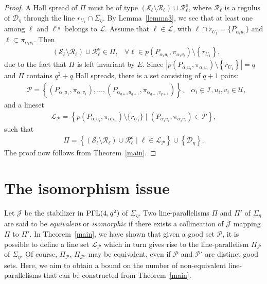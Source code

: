 \documentclass[11pt]{article}
\theoremstyle{definition}
\numberwithin{equation}{section}
\def\cI{\mathcal I}
\def\cJ{\mathcal J}
\def\cL{\mathcal L}
\def\cP{\mathcal P}
\def\cD{\mathcal D}
\def\cU{\mathcal U}
\def\cR{\mathcal R}
\def\cS{\mathcal S}
\def\PGaL{{\rm P\Gamma L}}
\begin{document}
\begin{proof}
A Hall spread of $\Pi$ must be of type $\left(\cS_{\ell} \setminus \cR_{\ell}\right) \cup \cR_{\ell}^o$, where $\cR_{\ell}$ is a regulus of $\cD_{\eta}$ through the line $r_{U_1} \cap \Sigma_{\eta}$. By Lemma~\ref{lemma3}, 
we see that at least one among $\ell$ and $\ell^{\tau_\eta}$ belongs to $\cL$. Assume that $\ell \in \cL$, with $\ell \cap r_{U_1} = \{P_{\alpha_i u_i}\}$ and $\ell \subset \pi_{\alpha_i v_i}$. Then
\begin{align*}
    & \left(\cS_{\ell} \setminus \cR_{\ell}\right) \cup \cR_{\ell}^o \in \Pi, & \forall \ell \in p\left( P_{\alpha_i u_i}, \pi_{\alpha_i v_i} \right) \setminus \left\{r_{U_1}\right\},
\end{align*}
due to the fact that $\Pi$ is left invariant by $E$. Since $\left|p\left( P_{\alpha_i u_i}, \pi_{\alpha_i v_i} \right) \setminus \left\{r_{U_1}\right\}\right| = q$ and $\Pi$ contains $q^2+q$ Hall spreads, there is a set consisting of $q+1$ pairs:
\begin{align*}
& \cP = \left\{\left(P_{\alpha_{1} u_1}, \pi_{\alpha_{1} v_1}\right), \dots, \left(P_{\alpha_{{q+1}} u_{q+1}}, \pi_{\alpha_{{q+1}} v_{q+1}}\right)\right\}, & \alpha_{i} \in \cI, u_i, v_i \in \cU, 
\end{align*}
and a lineset
\begin{align*}
\cL_{\cP} = \left\{p\left(P_{\alpha_{i} u_i}, \pi_{\alpha_{i} v_i}\right) \setminus \{r_{U_1}\} \mid \left(P_{\alpha_{i} u_i}, \pi_{\alpha_{i} v_i}\right) \in \cP \right\},
\end{align*}
such that 
\begin{align*}
\Pi = \left\{ \left(\cS_\ell \setminus \cR_{\ell}\right) \cup {\cR_{\ell}^o} \mid \ell \in \cL_{\cP} \right\} \cup \left\{\cD_{\eta}\right\}.  
\end{align*}
The proof now follows from Theorem~\ref{main}.
\end{proof}



\section{The isomorphism issue}

Let $\cJ$ be the stabilizer in $\PGaL(4, q^2)$ of $\Sigma_{\eta}$. Two line-parallelisms $\Pi$ and $\Pi'$ of $\Sigma_{\eta}$ are said to be {\em equivalent} or {\em isomorphic} if there exists a collineation of $\cJ$ mapping $\Pi$ to $\Pi'$. In Theorem~\ref{main}, we have shown that given a good set $\cP$, it is possible to define a line set $\cL_{\cP}$ which in turn gives rise to the line-parallelism $\Pi_{\cP}$ of $\Sigma_{\eta}$. Of course, $\Pi_{\cP}$, $\Pi_{\cP'}$ may be equivalent, even if $\cP$ and $\cP'$ are distinct good sets. Here, we aim to obtain a bound on the number of non-equivalent line-parallelisms that can be constructed from Theorem~\ref{main}. 
\end{document}
